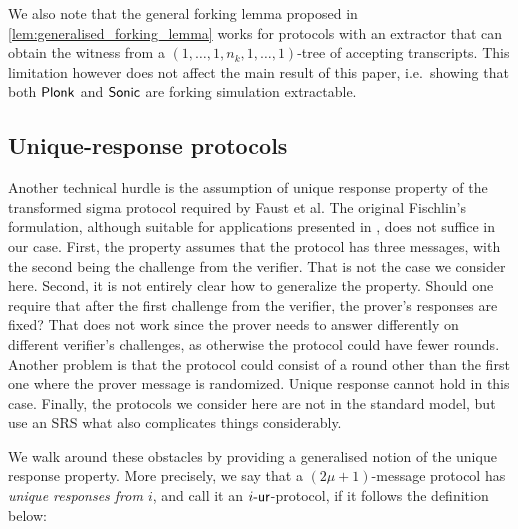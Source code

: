 \documentclass[runningheads,11pt]{llncs}
\begin{document}
We also note that the general forking lemma proposed in
\cref{lem:generalised_forking_lemma} works for protocols with an extractor that can obtain the
witness from a $(1, \ldots, 1, n_k, 1, \ldots, 1)$-tree of accepting
transcripts. This limitation however does not affect the main result of this
paper, i.e.~showing that both $\textnormal{\textsf{Plonk}}$ and ${\textnormal{\textsf{Sonic}}}$ are forking simulation extractable.

\subsection{Unique-response protocols}
Another technical hurdle is the assumption of unique response property 
of the transformed sigma protocol required by Faust et al. The original
Fischlin's formulation, although suitable for applications presented in
\cite{C:Fischlin05,INDOCRYPT:FKMV12}, does not suffice in our case. First,
the property assumes that the protocol has three messages, with the second being
the challenge from the verifier. That is not the case we consider here. Second,
it is not entirely clear how to generalize the property. Should one require that
after the first challenge from the verifier, the prover's responses are fixed?
That does not work since the prover needs to answer differently on different
verifier's challenges, as otherwise the protocol could have fewer
rounds. Another problem is that the protocol could consist of
a round other than the first one where the prover message is randomized.
Unique response cannot hold in this case. Finally, the protocols we
consider here are not in the standard model, but use an SRS
what also complicates things considerably.

We walk around these obstacles by providing a generalised notion of the unique
response property. More precisely, we say that a $(2\mu + 1)$-message protocol
has \emph{unique responses from $i$}, and call it an ${i\text{-}\mathsf{ur}}$-protocol, if it
follows the definition below:
\end{document}

